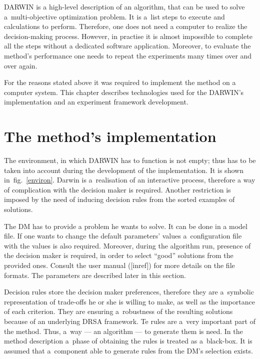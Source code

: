 DARWIN is a high-level description of an algorithm, that can be used to solve
a~multi-objective optimization problem. It is a~list steps to execute and
calculations to perform. Therefore, one does not need a computer to realize
the decision-making process. However, in practise it is almost impossible to
complete all the steps without a dedicated software application. Moreover, to
evaluate the method's performance one needs to repeat the experiments many
times over and over again.

For the reasons stated above it was required to implement the method on a
computer system. This chapter describes technologies used for the DARWIN's
implementation and an experiment framework development.

\section{The method's implementation}

The environment, in which DARWIN has to function is not empty; thus has to be
taken into account during the development of the implementation. It is shown
in~fig.~\ref{environ}. Darwin is a~realisation of an interactive process,
therefore a way of complication with the decision maker is required. Another
restriction is imposed by the need of inducing decision rules from the sorted
examples of solutions.

The DM has to provide a problem he wants to solve. It can be done in a model
file. If one wants to change the default parameters' values a~configuration
file with the values is also required. Moreover, during the algorithm run,
presence of the decision maker is required, in order to select ``good''
solutions from the provided ones. Consult the user manual ([inref]) for more
details on the file formats. The parameters are described later in this
section.

Decision rules store the decision maker preferences, therefore they are
a~symbolic representation of trade-offs he or she is willing to make, as well
as the importance of each criterion. They are ensuring a~robustness of the
resulting solutions because of an underlying DRSA framework. Te rules are
a~very important part of the method. Thus, a~way --- an algorithm --- to
generate them is need. In the method description a~phase of obtaining the
rules is treated as a~black-box. It is assumed that a~component able to
generate rules from the DM's selection exists.



